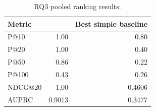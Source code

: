 \begin{table}[t]
\centering
\caption{RQ3 pooled ranking results.}
\label{tab:rq3-ranking}
\begin{tabular}{lrr}
\toprule
Metric & \primary{} & Best simple baseline \\
\midrule
P@10 & 1.00 & 0.80 \\
P@20 & 1.00 & 0.40 \\
P@50 & 0.86 & 0.22 \\
P@100 & 0.43 & 0.26 \\
NDCG@20 & 1.00 & 0.4606 \\
AUPRC & 0.9013 & 0.3477 \\
\bottomrule
\end{tabular}
\end{table}
